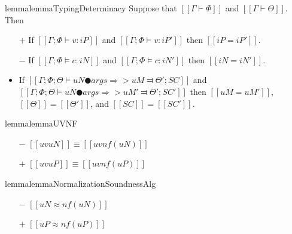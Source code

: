 \begin{restatable}{lemma}{lemmaTypingDeterminacy}
    \label{lemma:typing-determinacy}
    Suppose that $[[Γ ⊢ Φ]]$ and $[[Γ ⊢ Θ]]$. Then 
    \begin{itemize}
        \item [$+$] If $[[Γ; Φ ⊨ v : iP]]$ and $[[Γ; Φ ⊨ v : iP']]$ then $[[iP = iP']]$.
        \item [$-$] If $[[Γ; Φ ⊨ c : iN]]$ and $[[Γ; Φ ⊨ c : iN']]$ then $[[iN = iN']]$.
        \item If $[[Γ; Φ; Θ ⊨ uN ● args ⇒> uM ⫤ Θ'; SC]]$ and 
            $[[Γ; Φ; Θ ⊨ uN ● args ⇒> uM' ⫤ Θ'; SC']]$ then 
            $[[uM = uM']]$, $[[Θ]] = [[Θ']]$, and $[[SC]] =[[SC']]$.  
    \end{itemize}
\end{restatable}

\begin{restatable}{lemma}{lemmaUVNF}
    \label{lemma:uv-nf}
    \hfill\\
    \begin{itemize}
    \item[$-$] $[[uv uN]] \equiv [[uv nf(uN)]]$
    \item[$+$] $[[uv uP]] \equiv [[uv nf(uP)]]$
    \end{itemize}
\end{restatable}

\begin{restatable}{lemma}{lemmaNormalizationSoundnessAlg}
    \label{lemma:normalization-soundness-alg}
    \hfill
    \begin{itemize}
        \item[$-$] $[[uN ≈ nf(uN)]]$
        \item[$+$] $[[uP ≈ nf(uP)]]$
    \end{itemize}
\end{restatable}
